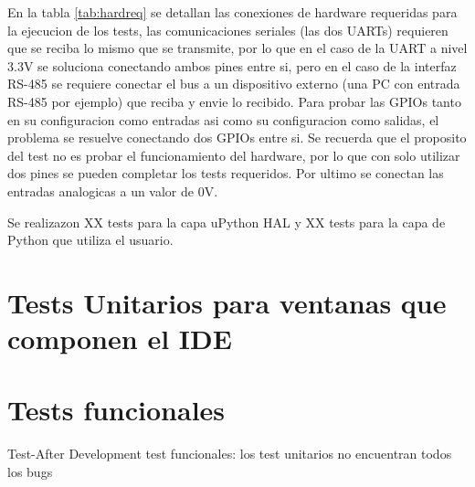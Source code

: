 En la tabla \ref{tab:hardreq} se detallan las conexiones de hardware requeridas para la ejecucion de los tests, las comunicaciones seriales (las dos UARTs) requieren que se reciba lo mismo que se transmite, por lo que en el caso de la UART a nivel 3.3V se soluciona conectando ambos pines entre si, pero en el caso de la interfaz RS-485 se requiere conectar el bus a un dispositivo externo (una PC con entrada RS-485 por ejemplo) que reciba y envie lo recibido.
Para probar las GPIOs tanto en su configuracion como entradas asi como su configuracion como salidas, el problema se resuelve conectando dos GPIOs entre si. Se recuerda que el proposito del test no es probar el funcionamiento del hardware, por lo que con solo utilizar dos pines se pueden completar los tests requeridos. Por ultimo se conectan las entradas analogicas a un valor de 0V.

Se realizazon XX tests para la capa uPython HAL y XX tests para la capa de Python que utiliza el usuario.

\section{Tests Unitarios para ventanas que componen el IDE}
\label{sec:testUnitariosIDE}




\section{Tests funcionales}
\label{sec:testUnitariosIDE}


Test-After Development
test funcionales:
los test unitarios no encuentran todos los bugs

